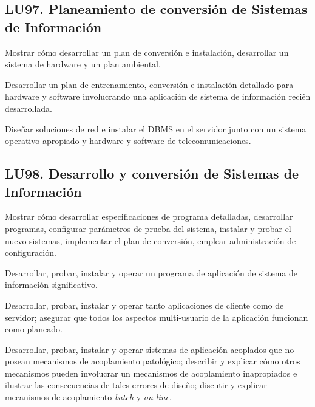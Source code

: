\subsection{LU97. Planeamiento de conversión de Sistemas de Información}\label{sec:LU97}
\begin{LearningUnit}
\begin{LUGoal}
\item Mostrar cómo desarrollar un plan de conversión e instalación, desarrollar un sistema de hardware y un plan ambiental.
\end{LUGoal}

\begin{LUObjective}
\item Desarrollar un plan de entrenamiento, conversión e instalación detallado para hardware y software involucrando una aplicación de sistema de información recién desarrollada.
\item Diseñar soluciones de red e instalar el DBMS en el servidor junto con un sistema operativo apropiado y hardware y software de telecomunicaciones.
\end{LUObjective}
\end{LearningUnit}

\subsection{LU98. Desarrollo y conversión de Sistemas de Información}\label{sec:LU98}
\begin{LearningUnit}
\begin{LUGoal}
\item Mostrar cómo desarrollar especificaciones de programa detalladas, desarrollar programas, configurar parámetros de prueba del sistema, instalar y probar el nuevo sistemas, implementar el plan de conversión, emplear administración de configuración.
\end{LUGoal}

\begin{LUObjective}
\item Desarrollar, probar, instalar y operar un programa de aplicación de sistema de información significativo.
\item Desarrollar, probar, instalar y operar tanto aplicaciones de cliente como de servidor; asegurar que todos los aspectos multi-usuario de la aplicación funcionan como planeado.
\item Desarrollar, probar, instalar y operar sistemas de aplicación acoplados que no posean mecanismos de acoplamiento patológico; describir y explicar cómo otros mecanismos pueden involucrar un mecanismos de acoplamiento inapropiados e ilustrar las consecuencias de tales errores de diseño; discutir y explicar mecanismos de acoplamiento {\it batch} y {\it on-line}.
\end{LUObjective}
\end{LearningUnit}


